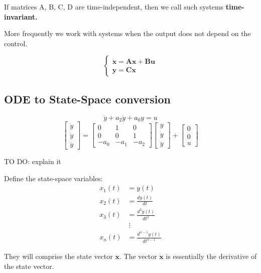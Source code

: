 If matrices A, B, C, D are time-independent, then we call such systems \textbf{time-invariant.} 

More frequently we work with systems when the output does not depend on the control. 

\begin{equation}
    \begin{cases}
    \mathbf{\dot{x}}=\mathbf{A}\mathbf{x} + \mathbf{B}\mathbf{u} \\
    \mathbf{y}=\mathbf{C}\mathbf{x}
    \end{cases}
    \end{equation}


    
\subsection{ODE to State-Space conversion}
\[
\dddot{y} + a_2 \ddot{y} + a_0 y = u
\]
\[
\begin{bmatrix}
\dot{y} \\
\ddot{y} \\
\dddot{y}
\end{bmatrix} = 
\begin{bmatrix}
0 & 1 & 0 \\
0 & 0 & 1 \\
-a_0 & -a_1 & -a_2
\end{bmatrix}
\begin{bmatrix}
y \\
\dot{y} \\
\ddot{y}
\end{bmatrix} + 
\begin{bmatrix}
0 \\
0 \\
u
\end{bmatrix}
\]

TO DO: explain it

Define the state-space variables:
\[
\begin{aligned}
    x_1(t) &= y(t) \\
    x_2(t) &= \frac{dy(t)}{dt} \\
    x_3(t) &= \frac{d^2 y(t)}{dt^2} \\
    &\ \vdots \\
    x_n(t) &= \frac{d^{n-1} y(t)}{dt^{n-1}}
\end{aligned}
\]

They will comprise the state vector \(\mathbf{x}\). The vector \(\dot{\mathbf{x}}\) is essentially the derivative of the state vector. 


